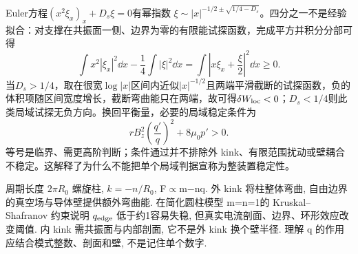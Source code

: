 Euler方程$(x^2\xi_x)_x+D_s\xi=0$有幂指数
$\xi\sim|x|^{-1/2\pm\sqrt{1/4-D_s}}$。四分之一不是经验拟合：对支撑在共振面一侧、边界为零的有限能试探函数，完成平方并积分分部可得
\begin{equation}
\int x^2|\xi_x|^2\dd x-\frac14\int|\xi|^2\dd x
=\int\left|x\xi_x+\frac{\xi}{2}\right|^2\dd x\ge0 .
\end{equation}
当$D_s>1/4$，取在很宽$\log|x|$区间内近似$|x|^{-1/2}$且两端平滑截断的试探函数，负的体积项随区间宽度增长，截断弯曲能只在两端，故可得$\delta W_{\rm loc}<0$；$D_s<1/4$则此类局域试探无负方向。换回平衡量，必要的局域稳定条件为
\begin{equation}
rB_z^2\left(\frac{q'}q\right)^2+8\mu_0p'>0 .
\end{equation}
等号是临界、需更高阶判断；条件通过并不排除外 kink、有限范围扰动或壁耦合不稳定。这解释了为什么不能把单个局域判据宣称为整装置稳定性。

周期长度 $2\pi R_0$ 螺旋柱, $k=-n/R_0$, F\ensuremath{\propto}m\ensuremath{-}nq. 外 kink 将柱整体弯曲, 自由边界的真空场与导体壁提供额外弯曲能. 在简化圆柱模型 m=n=1的 Kruskal--Shafranov 约束说明 $q_{\rm edge}$ 低于约1容易失稳, 但真实电流剖面、边界、环形效应改变阈值. 内 kink 需共振面与内部剖面, 它不是外 kink 换个壁半径. 理解 q 的作用应结合模式整数、剖面和壁, 不是记住单个数字.
